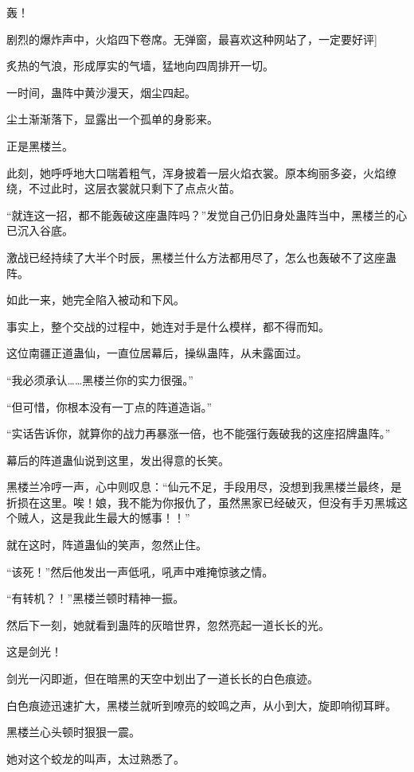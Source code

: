 
\begin{this_body}

轰！

剧烈的爆炸声中，火焰四下卷席。无弹窗，最喜欢这种网站了，一定要好评]

炙热的气浪，形成厚实的气墙，猛地向四周排开一切。

一时间，蛊阵中黄沙漫天，烟尘四起。

尘土渐渐落下，显露出一个孤单的身影来。

正是黑楼兰。

此刻，她呼呼地大口喘着粗气，浑身披着一层火焰衣裳。原本绚丽多姿，火焰缭绕，不过此时，这层衣裳就只剩下了点点火苗。

“就连这一招，都不能轰破这座蛊阵吗？”发觉自己仍旧身处蛊阵当中，黑楼兰的心已沉入谷底。

激战已经持续了大半个时辰，黑楼兰什么方法都用尽了，怎么也轰破不了这座蛊阵。

如此一来，她完全陷入被动和下风。

事实上，整个交战的过程中，她连对手是什么模样，都不得而知。

这位南疆正道蛊仙，一直位居幕后，操纵蛊阵，从未露面过。

“我必须承认……黑楼兰你的实力很强。”

“但可惜，你根本没有一丁点的阵道造诣。”

“实话告诉你，就算你的战力再暴涨一倍，也不能强行轰破我的这座招牌蛊阵。”

幕后的阵道蛊仙说到这里，发出得意的长笑。

黑楼兰冷哼一声，心中则叹息：“仙元不足，手段用尽，没想到我黑楼兰最终，是折损在这里。唉！娘，我不能为你报仇了，虽然黑家已经破灭，但没有手刃黑城这个贼人，这是我此生最大的憾事！！”

就在这时，阵道蛊仙的笑声，忽然止住。

“该死！”然后他发出一声低吼，吼声中难掩惊骇之情。

“有转机？！”黑楼兰顿时精神一振。

然后下一刻，她就看到蛊阵的灰暗世界，忽然亮起一道长长的光。

这是剑光！

剑光一闪即逝，但在暗黑的天空中划出了一道长长的白色痕迹。

白色痕迹迅速扩大，黑楼兰就听到嘹亮的蛟鸣之声，从小到大，旋即响彻耳畔。

黑楼兰心头顿时狠狠一震。

她对这个蛟龙的叫声，太过熟悉了。


\end{this_body}
